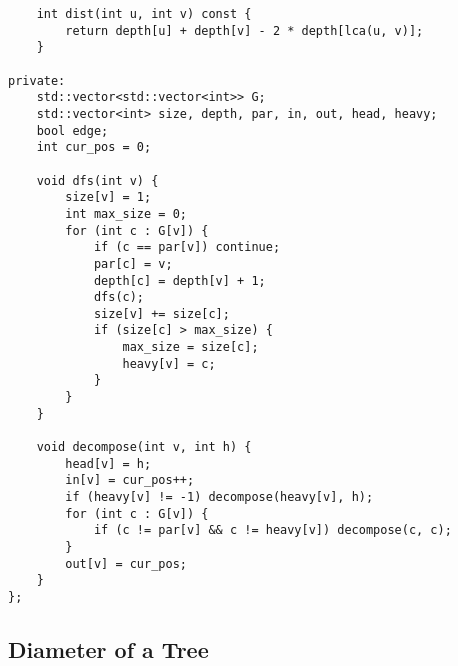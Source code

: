 \begin{lstlisting}
    int dist(int u, int v) const {
        return depth[u] + depth[v] - 2 * depth[lca(u, v)];
    }

private:
    std::vector<std::vector<int>> G;
    std::vector<int> size, depth, par, in, out, head, heavy;
    bool edge;
    int cur_pos = 0;

    void dfs(int v) {
        size[v] = 1;
        int max_size = 0;
        for (int c : G[v]) {
            if (c == par[v]) continue;
            par[c] = v;
            depth[c] = depth[v] + 1;
            dfs(c);
            size[v] += size[c];
            if (size[c] > max_size) {
                max_size = size[c];
                heavy[v] = c;
            }
        }
    }

    void decompose(int v, int h) {
        head[v] = h;
        in[v] = cur_pos++;
        if (heavy[v] != -1) decompose(heavy[v], h);
        for (int c : G[v]) {
            if (c != par[v] && c != heavy[v]) decompose(c, c);
        }
        out[v] = cur_pos;
    }
};

\end{lstlisting}

\subsection{Diameter of a Tree}

